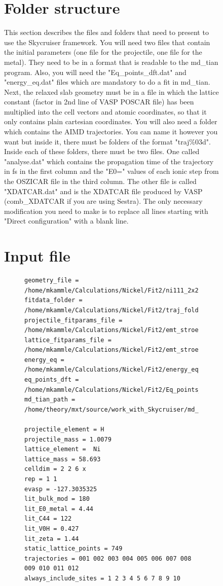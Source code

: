 \documentclass[twoside, 11pt, titlepage, captions=nooneline, a4paper, headsepline]{scrbook}%
\newcommand{\9}{\mathrm}
\newcommand{\0}{\,\mathrm}
\begin{document}
\begin{figure}[b!]
\section{Folder structure}
This section describes the files and folders that need to present to use the Skycruiser framework. You will need two files that contain the initial parameters (one file for the projectile, one file for the metal). They need to be in a format that is readable to the md\_tian program. Also, you will need the "Eq\_points\_dft.dat" and "energy\_eq.dat" files which are mandatory to do a fit in md\_tian. Next, the relaxed slab geometry must be in a file in which the lattice constant (factor in 2nd line of VASP POSCAR file) has been multiplied into the cell vectors and atomic coordinates, so that it only contains plain cartesian coordinates. You will also need a folder which contains the AIMD trajectories. You can name it however you want but inside it, there must be folders of the format "traj\%03d". Inside each of these folders, there must be two files. One called "analyse.dat" which contains the propagation time of the trajectory in fs in the first column and the "E0=" values of each ionic step from the OSZICAR file in the third column. The other file is called "XDATCAR.dat" and is the XDATCAR file produced by VASP (comb\_XDATCAR if you are using Sestra). The only necessary modification you need to make is to replace all lines starting with "Direct configuration" with a blank line.

\section{Input file}
\begin{figure}
\begin{verbatim}
geometry_file = /home/mkammle/Calculations/Nickel/Fit2/ni111_2x2x6.POSCAR
fitdata_folder = /home/mkammle/Calculations/Nickel/Fit2/traj_folder
projectile_fitparams_file = /home/mkammle/Calculations/Nickel/Fit2/emt_stroem_H.nml
lattice_fitparams_file = /home/mkammle/Calculations/Nickel/Fit2/emt_stroem_Ni.nml
energy_eq = /home/mkammle/Calculations/Nickel/Fit2/energy_eq.dat
eq_points_dft = /home/mkammle/Calculations/Nickel/Fit2/Eq_points_dft.dat
md_tian_path = /home/theory/mxt/source/work_with_Skycruiser/md_tian_1021

projectile_element = H
projectile_mass = 1.0079
lattice_element =  Ni
lattice_mass = 58.693
celldim = 2 2 6 x
rep = 1 1
evasp = -127.3035325
lit_bulk_mod = 180
lit_E0_metal = 4.44
lit_C44 = 122
lit_V0H = 0.427
lit_zeta = 1.44
static_lattice_points = 749
trajectories = 001 002 003 004 005 006 007 008 009 010 011 012
always_include_sites = 1 2 3 4 5 6 7 8 9 10


\end{verbatim}
\end{figure}
\end{figure}
\end{document}
